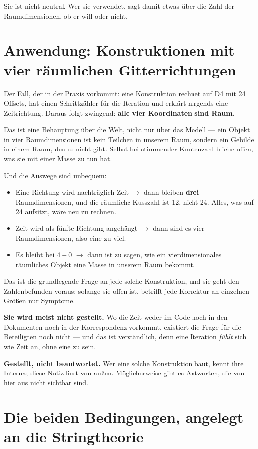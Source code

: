 \documentclass[11pt]{report}
\begin{document}
Sie ist nicht neutral. Wer sie verwendet, sagt damit etwas über die
Zahl der Raumdimensionen, ob er will oder nicht.

\chapter{Anwendung: Konstruktionen mit vier räumlichen
Gitterrichtungen}

Der Fall, der in der Praxis vorkommt: eine Konstruktion rechnet auf D4
mit 24 Offsets, hat einen Schrittzähler für die Iteration und erklärt
nirgends eine Zeitrichtung. Daraus folgt zwingend: \textbf{alle vier
Koordinaten sind Raum.}

Das ist eine Behauptung über die Welt, nicht nur über das Modell ---
ein Objekt in vier Raumdimensionen ist kein Teilchen in unserem Raum,
sondern ein Gebilde in einem Raum, den es nicht gibt. Selbst bei
stimmender Knotenzahl bliebe offen, was sie mit einer Masse zu tun hat.

Und die Auswege sind unbequem:
\begin{itemize}
\item Eine Richtung wird nachträglich Zeit $\to$ dann bleiben
  \textbf{drei} Raumdimensionen, und die räumliche Kusszahl ist 12,
  nicht 24. Alles, was auf 24 aufsitzt, wäre neu zu rechnen.
\item Zeit wird als fünfte Richtung angehängt $\to$ dann sind es vier
  Raumdimensionen, also eine zu viel.
\item Es bleibt bei $4+0$ $\to$ dann ist zu sagen, wie ein
  vierdimensionales räumliches Objekt eine Masse in unserem Raum
  bekommt.
\end{itemize}

Das ist die grundlegende Frage an jede solche Konstruktion, und sie
geht den Zahlenbefunden voraus: solange sie offen ist, betrifft jede
Korrektur an einzelnen Größen nur Symptome.

\textbf{Sie wird meist nicht gestellt.} Wo die Zeit weder im Code noch
in den Dokumenten noch in der Korrespondenz vorkommt, existiert die
Frage für die Beteiligten noch nicht --- und das ist verständlich, denn
eine Iteration \emph{fühlt} sich wie Zeit an, ohne eine zu sein.

\textbf{Gestellt, nicht beantwortet.} Wer eine solche Konstruktion
baut, kennt ihre Interna; diese Notiz liest von außen. Möglicherweise
gibt es Antworten, die von hier aus nicht sichtbar sind.

\chapter{Die beiden Bedingungen, angelegt an die Stringtheorie}
\end{document}
